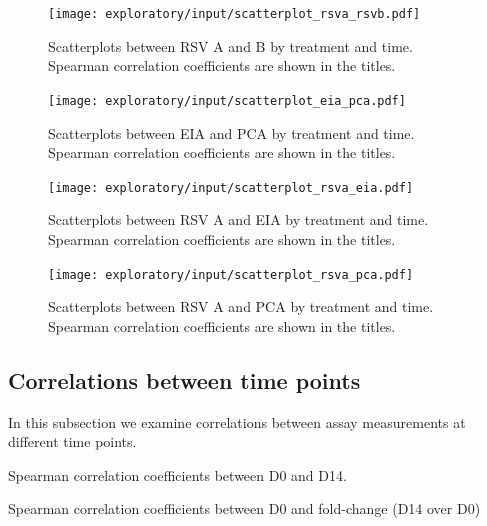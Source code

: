\documentclass[11pt]{article}
\begin{document}
\begin{figure}[!ht]
    \centering
    \texttt{[image: exploratory/input/scatterplot\_rsva\_rsvb.pdf]}
    \caption{Scatterplots between RSV A and B by treatment and time. Spearman correlation coefficients are shown in the titles.}
\end{figure}

\begin{figure}[!ht]
    \centering
    \texttt{[image: exploratory/input/scatterplot\_eia\_pca.pdf]}
    \caption{Scatterplots between EIA and PCA by treatment and time. Spearman correlation coefficients are shown in the titles.}
    \label{fig:scatterplot_eia_pca}
\end{figure}

\begin{figure}[!ht]
    \centering
    \texttt{[image: exploratory/input/scatterplot\_rsva\_eia.pdf]}
    \caption{Scatterplots between RSV A and EIA by treatment and time. Spearman correlation coefficients are shown in the titles.}
\end{figure}

\begin{figure}[!ht]
    \centering
    \texttt{[image: exploratory/input/scatterplot\_rsva\_pca.pdf]}
    \caption{Scatterplots between RSV A and PCA by treatment and time. Spearman correlation coefficients are shown in the titles.}
\end{figure}

\clearpage

\hypertarget{correlations-between-time-points}{%
\subsection{Correlations between time points}\label{correlations-between-time-points}}

In this subsection we examine correlations between assay measurements at different time points.

\begin{table}[H]
    \centering
    
    \caption{Spearman correlation coefficients between D0 and D14.}
\end{table}

\begin{table}[H]
    \centering
    
    \caption{Spearman correlation coefficients between D0 and fold-change (D14 over D0)}
\end{table}
\end{document}
